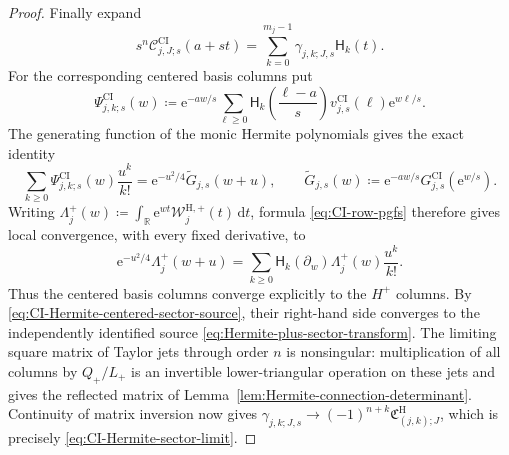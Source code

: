\documentclass[10pt]{amsart}
\newcommand{\e}{\mathrm e}
\newcommand{\dd}{\,\mathrm d}
\theoremstyle{plain}
\theoremstyle{definition}
\theoremstyle{remark}
\begin{document}
\begin{proof}
Finally expand
\[
 s^n\mathscr C_{j,J;s}^{\mathrm{CI}}(a+st)
 =\sum_{k=0}^{m_j-1}\gamma_{j,k;J,s}\mathsf H_k(t).
\]
For the corresponding centered basis columns put
\[
 \Psi_{j,k;s}^{\mathrm{CI}}(w)\coloneq
 \e^{-aw/s}\sum_{\ell\ge0}
 \mathsf H_k\left(\frac{\ell-a}{s}\right)
 v_{j,s}^{\mathrm{CI}}(\ell)\e^{w\ell/s}.
\]
The generating function of the monic Hermite polynomials gives the
exact identity
\[
 \sum_{k\ge0}\Psi_{j,k;s}^{\mathrm{CI}}(w)\frac{u^k}{k!}
 =\e^{-u^2/4}\widetilde G_{j,s}(w+u),
 \qquad
 \widetilde G_{j,s}(w)\coloneq
 \e^{-aw/s}G_{j,s}^{\mathrm{CI}}(\e^{w/s}).
\]
Writing
\(\Lambda_j^+(w)\coloneq
\int_{\mathbb R}\e^{wt}\mathcal W_j^{\mathrm H,+}(t)\dd t\),
formula \eqref{eq:CI-row-pgfs} therefore gives local convergence, with
every fixed derivative, to
\[
 \e^{-u^2/4}\Lambda_j^+(w+u)
 =\sum_{k\ge0}
 \mathsf H_k(\partial_w)\Lambda_j^+(w)\frac{u^k}{k!}.
\]
Thus the centered basis columns converge explicitly to the \(H^+\)
columns.  By
\eqref{eq:CI-Hermite-centered-sector-source}, their right-hand side
converges to the independently identified source
\eqref{eq:Hermite-plus-sector-transform}.  The limiting square matrix
of Taylor jets through order \(n\) is nonsingular: multiplication of
all columns by \(Q_+/L_+\) is an invertible lower-triangular operation
on these jets and gives the reflected matrix of
Lemma~\ref{lem:Hermite-connection-determinant}.
Continuity of matrix inversion now gives
\(\gamma_{j,k;J,s}\to(-1)^{n+k}
\mathfrak C_{(j,k);J}^{\mathrm H}\), which is precisely
\eqref{eq:CI-Hermite-sector-limit}.
\end{proof}
\end{document}
